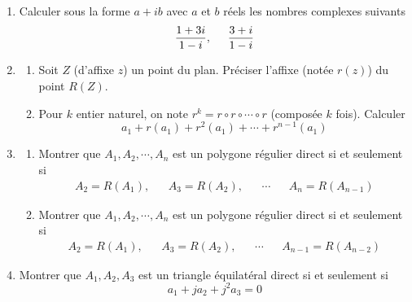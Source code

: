 \begin{enumerate}
 \item 
Calculer sous la forme $a+ib$ avec $a$ et $b$ réels les nombres complexes suivants
\begin{displaymath}
 \frac{1+3i}{1-i},\hspace{0.5cm} \frac{3+i}{1-i}
\end{displaymath}
\item 
\begin{enumerate}
 \item Soit $Z$ (d'affixe $z$) un point du plan. Préciser l'affixe (notée $r(z)$) du point $R(Z)$.
 \item Pour $k$ entier naturel, on note $r^k = r \circ r \circ \cdots \circ r$ (composée $k$ fois). Calculer
\begin{displaymath}
 a_1 + r(a_1) + r^2(a_1) + \cdots + r^{n-1}(a_1)
\end{displaymath}
\end{enumerate}
\item 
\begin{enumerate}
 \item Montrer que $A_1, A_2, \cdots , A_n$ est un polygone régulier direct si et seulement si 
\begin{align*}
 A_2 = R(A_1), & & A_3 = R(A_2), & & \cdots & & A_n = R(A_{n-1})
\end{align*}
\item  Montrer que $A_1, A_2, \cdots , A_n$ est un polygone régulier direct si et seulement si 
\begin{align*}
 A_2 = R(A_1), & & A_3 = R(A_2), & & \cdots & & A_{n-1} = R(A_{n-2})
\end{align*}
\end{enumerate}
 \item Montrer que $A_1, A_2, A_3$ est un triangle équilatéral direct si et seulement si
\begin{displaymath}
 a_1 + ja_2 + j^2 a_3 = 0
\end{displaymath}


\end{enumerate}
